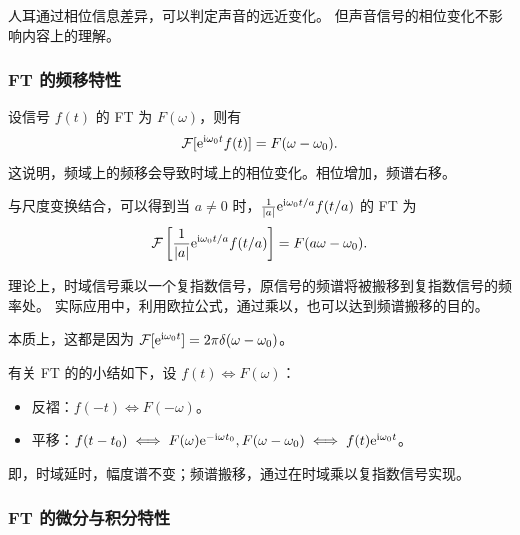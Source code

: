 \begin{example}
    人耳通过相位信息差异，可以判定声音的远近变化。
    但声音信号的相位变化不影响内容上的理解。
\end{example}

\subsubsection{FT 的频移特性}

\begin{property}
    设信号 $f(t)$ 的 FT 为 $F(\omega)$，则有
    \begin{align*}
        \mathcal{F}[\mathrm{e}^{\mathrm{i}\omega_0 t}f(t)] = F(\omega - \omega_0).
    \end{align*}
    这说明，频域上的频移会导致时域上的相位变化。相位增加，频谱右移。

    与尺度变换结合，可以得到当 $a \neq 0$ 时，$\frac{1}{|a|}\mathrm{e}^{\mathrm{i}\omega_0 t/a}f(t/a)$ 的 FT 为
    \begin{align*}
        \mathcal{F}\left[\frac{1}{|a|}\mathrm{e}^{\mathrm{i}\omega_0 t/a}f(t/a)\right] = F(a\omega - \omega_0).
    \end{align*}
\end{property}

\begin{remark}
    理论上，时域信号乘以一个复指数信号，原信号的频谱将被搬移到复指数信号的频率处。
    实际应用中，利用欧拉公式，通过乘以，也可以达到频谱搬移的目的。

    本质上，这都是因为 $\mathcal{F}[\mathrm{e}^{\mathrm{i} \omega_0 t}] = 2\pi\delta(\omega - \omega_0)$。
\end{remark}

\begin{note}
    有关 FT 的的小结如下，设 $f(t) \iff F(\omega)$：
    \begin{itemize}
        \item 反褶：$f(-t) \iff F(-\omega)$。
        \item 平移：$f(t - t_0) \iff F(\omega)\mathrm{e}^{-\mathrm{i}\omega t_0}, F(\omega - \omega_0) \iff f(t)\mathrm{e}^{\mathrm{i}\omega_0 t}$。
    \end{itemize}
    即，时域延时，幅度谱不变；频谱搬移，通过在时域乘以复指数信号实现。
\end{note}

\subsubsection{FT 的微分与积分特性}

